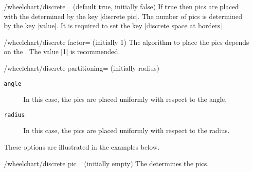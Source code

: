 \documentclass[a4paper,english,dvipsnames]{ltxdoc}
\begin{document}
\begin{key}{/wheelchart/discrete= (default true, initially false)}
If true then \tikzname{} pics are placed with the  determined by the key |discrete pic|. The number of pics is determined by the key |value|. It is required to set the key |discrete space at borders|.
\end{key}
\begin{key}{/wheelchart/discrete factor= (initially 1)}
The algorithm to place the \tikzname{} pics depends on the . The value |1| is recommended.
\end{key}
\begin{key}{/wheelchart/discrete partitioning= (initially radius)}
\begin{description}
\item[\texttt{angle}] In this case, the \tikzname{} pics are placed uniformly with respect to the angle.
\item[\texttt{radius}] In this case, the \tikzname{} pics are placed uniformly with respect to the radius.
\end{description}
These options are illustrated in the examples below.
\begin{codeexample}[]
\end{codeexample}
\end{key}
\begin{key}{/wheelchart/discrete pic= (initially \normalfont empty)}
The  determines the \tikzname{} pics.
\begin{codeexample}[width=10cm]
\begin{tikzpicture}[yscale=-1]
\wheelchart[
    data=,
    discrete,
    discrete pic={
        \fill[draw=black] (-0.3,-0.3)
            rectangle +(0.6,0.6);
        \node[black] at (0,0)
            {\WCcountdiscrete};
    },
    discrete space at borders,
    value=\WCvarA/2,
    ybar={8}{8}
]{\exampleforthismanual}
\end{tikzpicture}
\end{codeexample}
\end{key}
\end{document}
